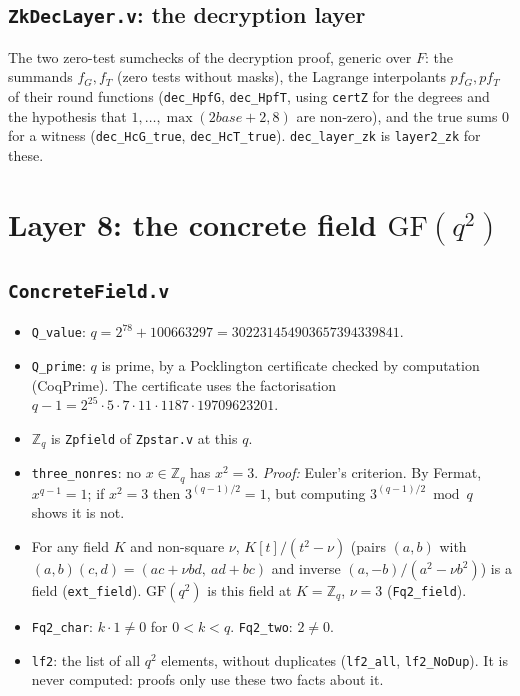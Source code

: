 \documentclass[11pt,a4paper]{article}
\newcommand{\Zq}{\mathbb{Z}_q}
\theoremstyle{definition}
\theoremstyle{plain}
\begin{document}
\subsection{\texttt{ZkDecLayer.v}: the decryption layer}

The two zero-test sumchecks of the decryption proof, generic over $F$: the summands $f_G,f_T$ (zero
tests without masks), the Lagrange interpolants $pf_G,pf_T$ of their round functions
(\texttt{dec\_HpfG}, \texttt{dec\_HpfT}, using \texttt{certZ} for the degrees and the hypothesis that
$1,\dots,\max(2\mathit{base}+2,8)$ are non-zero), and the true sums $0$ for a witness
(\texttt{dec\_HcG\_true}, \texttt{dec\_HcT\_true}). \texttt{dec\_layer\_zk} is \texttt{layer2\_zk} for these.

\section{Layer 8: the concrete field $\mathrm{GF}(q^2)$}
\label{sec:fm-concrete}

\subsection{\texttt{ConcreteField.v}}

\begin{itemize}[leftmargin=1.3em]
\item \texttt{Q\_value}: $q=2^{78}+100663297=302231454903657394339841$.
\item \texttt{Q\_prime}: $q$ is prime, by a Pocklington certificate checked by computation
  (CoqPrime). The certificate uses the factorisation
  $q-1=2^{25}\cdot5\cdot7\cdot11\cdot1187\cdot19709623201$.
\item $\Zq$ is \texttt{Zpfield} of \texttt{Zpstar.v} at this $q$.
\item \texttt{three\_nonres}: no $x\in\Zq$ has $x^2=3$. \emph{Proof:} Euler's criterion. By Fermat,
  $x^{q-1}=1$; if $x^2=3$ then $3^{(q-1)/2}=1$, but computing $3^{(q-1)/2}\bmod q$ shows it is not.
\item For any field $K$ and non-square $\nu$, $K[t]/(t^2-\nu)$ (pairs $(a,b)$ with
  $(a,b)(c,d)=(ac+\nu bd,\ ad+bc)$ and inverse $(a,-b)/(a^2-\nu b^2)$) is a field
  (\texttt{ext\_field}). $\mathrm{GF}(q^2)$ is this field at $K=\Zq$, $\nu=3$ (\texttt{Fq2\_field}).
\item \texttt{Fq2\_char}: $k\cdot1\ne0$ for $0<k<q$. \texttt{Fq2\_two}: $2\ne0$.
\item \texttt{lf2}: the list of all $q^2$ elements, without duplicates (\texttt{lf2\_all},
  \texttt{lf2\_NoDup}). It is never computed: proofs only use these two facts about it.
\end{itemize}
\end{document}
